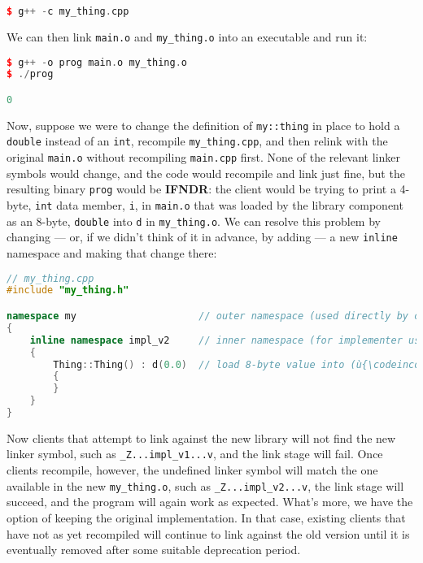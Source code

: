 \begin{lstlisting}[language=C++]
$ g++ -c my_thing.cpp
\end{lstlisting}

\noindent We can then link \texttt{main.o} and \texttt{my\_thing.o} into an
executable and run it:

\begin{lstlisting}[language=C++]
$ g++ -o prog main.o my_thing.o
$ ./prog

0
\end{lstlisting}

\noindent Now, suppose we were to change the definition of \texttt{my::thing} in
place to hold a \texttt{double} instead of an \texttt{int}, recompile
\texttt{my\_thing.cpp}, and then relink with the original
\texttt{main.o} without recompiling \texttt{main.cpp} first. None of the
relevant linker symbols would change, and the code would recompile and link
just fine, but the resulting binary \texttt{prog} would be
\textbf{IFNDR}: the client would be trying to print a 4-byte,
\texttt{int} data member, \texttt{i}, in \texttt{main.o} that was loaded
by the library component as an 8-byte, \texttt{double} into \texttt{d}
in \texttt{my\_thing.o}. We can resolve this problem by changing --- or,
if we didn't think of it in advance, by adding --- a new \texttt{inline}
namespace and making that change there:

\begin{lstlisting}[language=C++]
// my_thing.cpp
#include "my_thing.h"

namespace my                     // outer namespace (used directly by clients)
{
    inline namespace impl_v2     // inner namespace (for implementer use only)
    {
        Thing::Thing() : d(0.0)  // load 8-byte value into (ù{\codeincomments{Thing}}ù)'s data member
        {
        }
    }
}
\end{lstlisting}

\noindent Now clients that attempt to link against the new library will not find
the new linker symbol, such as \texttt{\_Z...impl\_v1...v}, and the link
stage will fail. Once clients recompile, however, the undefined linker
symbol will match the one available in the new \texttt{my\_thing.o},
such as \texttt{\_Z...impl\_v2...v}, the link stage will succeed, and
the program will again work as expected. What's more, we have the option
of keeping the original implementation. In that case, existing clients
that have not as yet recompiled will continue to link against the old
version until it is eventually removed after some suitable deprecation
period.

